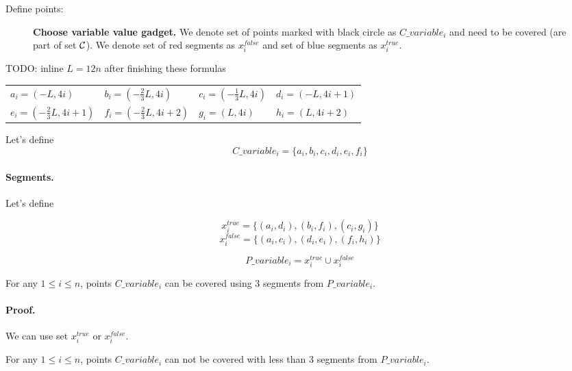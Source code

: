 Define points:
\begin{figure}[h]
\centering
\def\svgwidth{0.5\columnwidth}

\caption{\textbf{Choose variable value gadget.}
We denote set of points marked with black circle as $C\_variable_i$
and need to be covered (are part of set $\mathcal{C}$).
We denote set of red segments as $x^{false}_i$
and set of blue segments as $x^{true}_i$.}
\label{fig:apx_choose_variable}
\end{figure}

TODO: inline $L = 12n$ after finishing these formulas

\begin{center}
\begin{tabular}{ l l l l}
	$a_{i} = (-L, 4i)$ &
	$b_{i} = (-\frac{2}{3}L, 4i)$ & 
	$c_{i} = (-\frac{1}{3}L, 4i)$ & 
	$d_{i} = (-L, 4i+1)$ \\  
	$e_{i} = (-\frac{2}{3}L, 4i+1)$ & 
	$f_{i} = (-\frac{2}{3}L, 4i+2)$ &
	$g_i = (L, 4i)$ &
	$h_i = (L, 4i+2)$
\end{tabular}
\end{center}

Let's define $$C\_variable_i =  \{a_i, b_i, c_i, d_i, e_i, f_i\}$$	


\paragraph{Segments.}

Let's define 

$$x^{true}_i =\{ (a_i, d_i), (b_i, f_i), (c_i, g_i)\}$$
$$x^{false}_i = \{(a_i, c_i), (d_i, e_i), (f_i, h_i)\}$$

$$P\_variable_i = x^{true}_i \cup x^{false}_i$$


\begin{lemma}
\label{choose_variables_solution}
For any $1 \le i \le n$, points $C\_variable_i$
can be covered using 3 segments from $P\_variable_i$.
\end{lemma}

\paragraph{Proof.}
We can use set $x^{true}_i$ or $x^{false}_i$.


\begin{lemma}
\label{choose_variables_no_less}
For any $1 \le i \le n$, points $C\_variable_i$
can not be covered with less than 3 segments from $P\_variable_i$.
\end{lemma}

